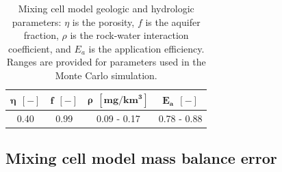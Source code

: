 \renewcommand{\arraystretch}{1.5}

\setlength{\tabcolsep}{1.5em}

\begin{table}[H]
	
	\caption{Mixing cell model geologic and hydrologic parameters: $\eta$ is the porosity, $f$ is the aquifer fraction, $\rho$ is the rock-water interaction coefficient, and $E_a$ is the application efficiency. Ranges are provided for parameters used in the Monte Carlo simulation.}
	
	\centering
	
	\begin{tabular}{cccc}
		
		$\bm{\eta \:\: [-]}$ & $\bm{f \:\: [-]}$ & $\bm{\rho \:\: [mg/km^3]}$ & $\bm{E_a \:\: [-]}$\\ 
		\hline
		0.40 & 0.99 & 0.09 - 0.17 & 0.78 - 0.88\\ 
		\hline
	\end{tabular}
	
	\label{ap_b_geometry}
\end{table}

\egroup



\subsection{Mixing cell model mass balance error}



\bgroup
\setlength{\tabcolsep}{3.5 em}

\centering
\renewcommand{\arraystretch}{1.0}


